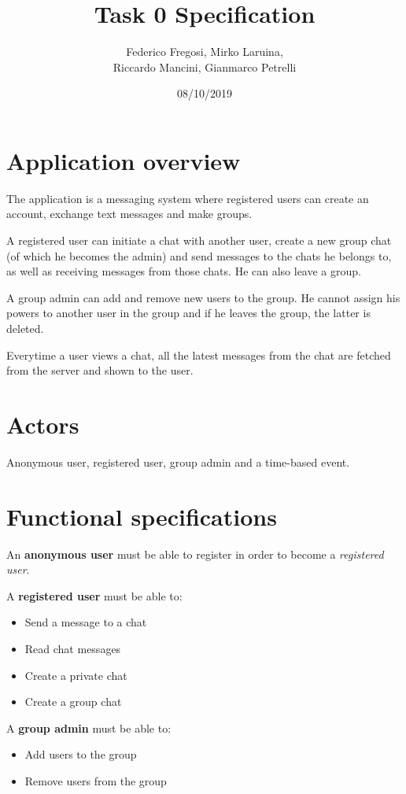 \documentclass[titlepage, 12pt]{article}
\title{Task 0 Specification}
\date{08/10/2019}
\author{Federico Fregosi, Mirko Laruina, \\Riccardo Mancini, Gianmarco Petrelli}
\begin{document}
\maketitle

\section{Application overview}
The application is a messaging system where registered users can create an 
account, exchange text messages and make groups.

A registered user can initiate a chat with another user, create a new group chat
(of which he becomes the admin) and send messages to the chats he belongs to,
as well as receiving messages from those chats. He can also leave a group.

A group admin can add and remove new users to the group. He cannot assign his
powers to another user in the group and if he leaves the group, the latter 
is deleted.

Everytime a user views a chat, all the latest messages from the chat are 
fetched from the server and shown to the user.

\section{Actors}
Anonymous user, registered user, group admin and a time-based event.

\section{Functional specifications}
An \textbf{anonymous user} must be able to register in order to become a 
\emph{registered user}.

A \textbf{registered user} must be able to:
\begin{itemize}
    \item Send a message to a chat
    \item Read chat messages
    \item Create a private chat
    \item Create a group chat
\end{itemize}

A \textbf{group admin} must be able to:
\begin{itemize}
    \item Add users to the group
    \item Remove users from the group
\end{itemize}
\end{document}
